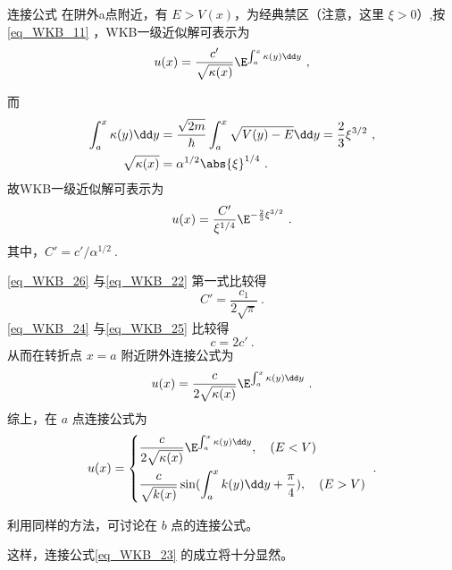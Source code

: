\begin{example}{连接公式}
在阱外a点附近，有 $E>V(x)$，为经典禁区（注意，这里 $\xi>0$）,按\autoref{eq_WKB_11} ，WKB一级近似解可表示为
\begin{equation}
u(x)=\frac{c'}{\sqrt{\kappa(x)}}\E^{\int_a^x\kappa(y)\dd y}~,
\end{equation}


而
\begin{equation}
\begin{aligned}
\int_a^x\kappa(y)\dd y&=
\frac{\sqrt{2m}}{\hbar}\int_a^x\sqrt{V(y)-E}\dd y=\frac{2}{3}\xi^{3/2}~,
\\
\sqrt{\kappa(x)}
&=
\alpha^{1/2}\abs{\xi}^{1/4}~.
\end{aligned}
\end{equation}
故WKB一级近似解可表示为
\begin{equation}\label{eq_WKB_26}
u(x)=\frac{C'}{\xi^{1/4}}\E^{-\frac{2}{3}\xi^{3/2}}~.
\end{equation}
其中，$C'=c'/\alpha^{1/2}~.$

\autoref{eq_WKB_26}  与\autoref{eq_WKB_22} 第一式比较得
\begin{equation}\label{eq_WKB_24}
C'=\frac{c_1}{2\sqrt{\pi}}~.
\end{equation}
\autoref{eq_WKB_24} 与\autoref{eq_WKB_25} 比较得
\begin{equation}
c=2c'~.
\end{equation}
从而在转折点 $x=a$ 附近阱外连接公式为
\begin{equation}
u(x)=\frac{c}{2\sqrt{\kappa(x)}}\E^{\int_a^x\kappa(y)\dd y}~.
\end{equation}
综上，在 $a$ 点连接公式为
\begin{equation}
u(x)=\left\{\begin{aligned}
&\frac{c}{2\sqrt{\kappa(x)}}\E^{\int_a^x\kappa(y)\dd y} ,\quad(E<V)\\
&\frac{c}{\sqrt{k(x)}}\sin(\int_a^x k(y)\dd y+\frac{\pi}{4}),\quad(E>V)
\end{aligned}\right.~.
\end{equation}

利用同样的方法，可讨论在 $b$ 点的连接公式。
\end{example}

这样，连接公式\autoref{eq_WKB_23} 的成立将十分显然。

